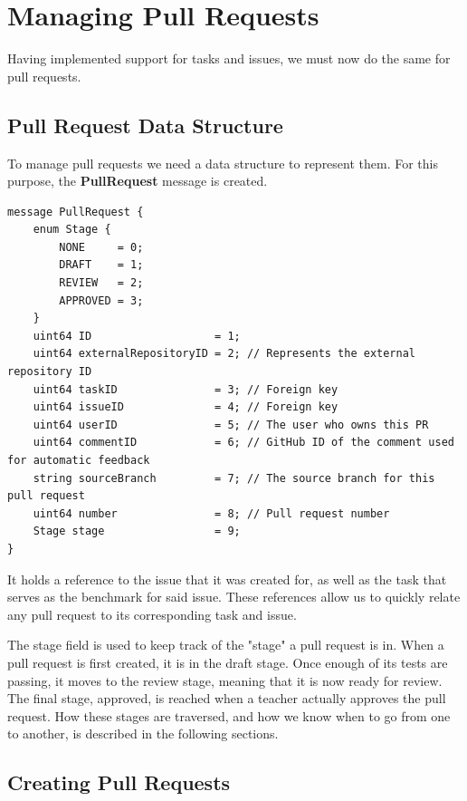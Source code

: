 \section{Managing Pull Requests}

Having implemented support for tasks and issues, we must now do the same for pull requests.

\subsection{Pull Request Data Structure}
\label{sec:pull-request-data-structure}

To manage pull requests we need a data structure to represent them.
For this purpose, the \textbf{PullRequest} message is created.

\begin{lstlisting}[caption={PullRequest message}]
message PullRequest {
    enum Stage {
        NONE     = 0;
        DRAFT    = 1;
        REVIEW   = 2;
        APPROVED = 3;
    }
    uint64 ID                   = 1;
    uint64 externalRepositoryID = 2; // Represents the external repository ID
    uint64 taskID               = 3; // Foreign key
    uint64 issueID              = 4; // Foreign key
    uint64 userID               = 5; // The user who owns this PR
    uint64 commentID            = 6; // GitHub ID of the comment used for automatic feedback
    string sourceBranch         = 7; // The source branch for this pull request
    uint64 number               = 8; // Pull request number
    Stage stage                 = 9;
}
\end{lstlisting}

It holds a reference to the issue that it was created for, as well as the task that serves as the benchmark for said issue.
These references allow us to quickly relate any pull request to its corresponding task and issue.

The stage field is used to keep track of the "stage" a pull request is in.
When a pull request is first created, it is in the draft stage.
Once enough of its tests are passing, it moves to the review stage, meaning that it is now ready for review.
The final stage, approved, is reached when a teacher actually approves the pull request.
How these stages are traversed, and how we know when to go from one to another, is described in the following sections.

\subsection{Creating Pull Requests}

